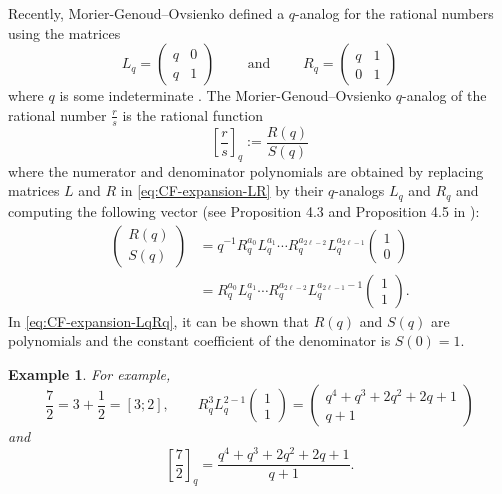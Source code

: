\documentclass[a4paper,12pt]{amsart}
\newtheorem{example}[definition]{Example}
\newcommand{\0}{\mathtt{0}}
\newcommand{\1}{\mathtt{1}}
\newcommand{\2}{\mathtt{2}}
\newcommand{\3}{\mathtt{3}}
\begin{document}
Recently,
Morier-Genoud--Ovsienko defined
a $q$-analog for the rational numbers using the matrices
\[
    L_q=
\left(\begin{array}{rr}
q & 0 \\
q & 1
\end{array}\right)
\qquad
\text{ and }
\qquad
    R_q=
\left(\begin{array}{rr}
q & 1 \\
0 & 1
\end{array}\right)
\]
where $q$ is some indeterminate \cite{MR4073883}.
The Morier-Genoud--Ovsienko $q$-analog of the rational number $\frac{r}{s}$
is the rational function
\[
    \left[\frac{r}{s}\right]_q
    :=
    \frac{R(q)}{S(q)}
\]
where the numerator and denominator polynomials are obtained
by replacing matrices $L$ and $R$ in \eqref{eq:CF-expansion-LR}
by their $q$-analogs $L_q$ and $R_q$
and computing the following vector
(see Proposition 4.3 and Proposition 4.5 in \cite{MR4073883}):
\begin{equation}\label{eq:CF-expansion-LqRq}
    \begin{aligned}
    \left(\begin{array}{c} R(q) \\ S(q) \end{array}\right)
        &= q^{-1} R_q^{a_0}L_q^{a_1}\cdots R_q^{a_{2\ell-2}}L_q^{a_{2\ell-1}}
                \left(\begin{smallmatrix} 1 \\ 0 \end{smallmatrix}\right)\\
        &= R_q^{a_0}L_q^{a_1}\cdots R_q^{a_{2\ell-2}}L_q^{a_{2\ell-1}-1}
                \left(\begin{smallmatrix} 1 \\ 1 \end{smallmatrix}\right).
    \end{aligned}
\end{equation}
In \eqref{eq:CF-expansion-LqRq},
it can be shown that
$R(q)$ and $S(q)$ are polynomials
and the constant coefficient of the denominator is $S(0)=1$.


\begin{example}
For example,
\[
    \frac{7}{2}
    = 3 + \frac{\displaystyle 1}{\displaystyle 2 }
    = [3;2],
    \qquad
        R_q^{3}L_q^{2-1}
         \left(\begin{array}{c} 1 \\ 1 \end{array}\right)
        =
    \left(\begin{array}{c} {q^{4} + q^{3} + 2q^{2} + 2q + 1} \\ {q + 1} \end{array}\right)
\]
and
\[
    \left[\frac{7}{2}\right]_q
    =
    \frac{q^{4} + q^{3} + 2q^{2} + 2q + 1}{q + 1}.
\]
\end{example}
\end{document}
